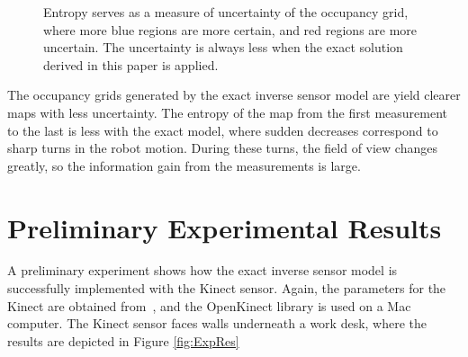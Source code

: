 \documentclass[letterpaper, 10pt, conference]{ieeeconf}
\begin{document}
\begin{figure}[h]
\label{fig:NumResOccH}
\centerline{
}
\centerline{
}
\caption{Entropy serves as a measure of uncertainty of the occupancy grid, where more blue regions are more certain, and red regions are more uncertain. The uncertainty is always less when the exact solution derived in this paper is applied.}
\end{figure}

The occupancy grids generated by the exact inverse sensor model are yield clearer maps with less uncertainty.
The entropy of the map from the first measurement to the last is less with the exact model, where sudden decreases correspond to sharp turns in the robot motion.
During these turns, the field of view changes greatly, so the information gain from the measurements is large.

\section{Preliminary Experimental Results}
\label{sec:ExpRes}

A preliminary experiment shows how the exact inverse sensor model is successfully implemented with the Kinect sensor.
Again, the parameters for the Kinect are obtained from~\cite{KhoElb12}, and the OpenKinect library is used on a Mac computer.
The Kinect sensor faces walls underneath a work desk, where the results are depicted in Figure \ref{fig:ExpRes}
\end{document}
